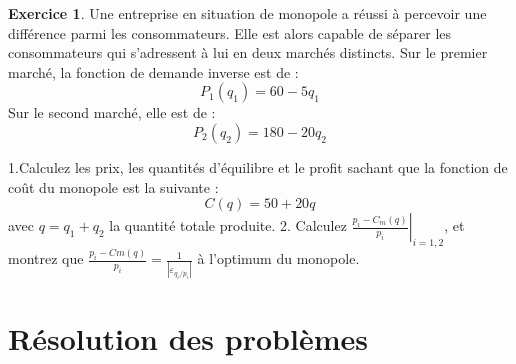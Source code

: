 \documentclass[
]{book}
\theoremstyle{definition}
\theoremstyle{definition}
\theoremstyle{definition}
\newtheorem{exercise}{Exercice}[chapter]
\theoremstyle{definition}
\theoremstyle{remark}
\begin{document}
\begin{exercise}
\protect\hypertarget{exr:discriminationexo4}{}\label{exr:discriminationexo4}Une entreprise en situation de monopole a réussi à percevoir
une différence parmi les consommateurs. Elle est alors capable de
séparer les consommateurs qui s'adressent à lui en deux marchés
distincts. Sur le premier marché, la fonction de demande
inverse est de : \[P_{1}(q_{1})=60-5q_{1}\] Sur le second marché,
elle est de : \[P_{2}(q_{2})=180-20q_{2}\]

1.Calculez les prix, les quantités d'équilibre et le profit sachant que la fonction de coût du monopole est la suivante : \[C(q)=50+20q\]
avec \(q=q_1+q_2\) la quantité totale produite.
2. Calculez \(\left.\frac{p_{i}-C_m(q)}{p_i}\right|_{i=1,2}\), et
montrez que
\(\frac{p_{i}-Cm(q)}{p_{i}}=\frac{1}{\left|\varepsilon_{q_i/p_i}\right|}\) à l'optimum du monopole.
\end{exercise}

\hypertarget{appendix-annexes}{%
\appendix}


\hypertarget{ruxe9solution-des-probluxe8mes}{%
\chapter{Résolution des problèmes}\label{ruxe9solution-des-probluxe8mes}}
\end{document}
